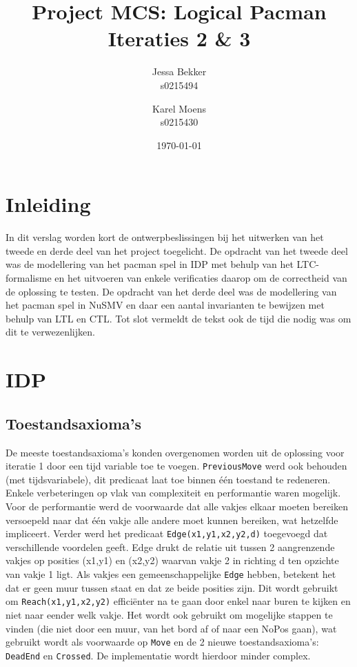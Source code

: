 \documentclass[a4paper,12pt]{article}
\title{Project MCS: Logical Pacman \\ Iteraties 2 \& 3}
\author{Jessa Bekker\\s0215494 \and Karel Moens \\ s0215430 }
\date{\today}
\begin{document}
\maketitle


\section{Inleiding}
In dit verslag worden kort de ontwerpbeslissingen bij het uitwerken van het tweede en derde deel van het project toegelicht.
De opdracht van het tweede deel was de modellering van het pacman spel  in IDP met behulp van het LTC-formalisme en het uitvoeren van enkele verificaties daarop om de correctheid van de oplossing te testen.
De opdracht van het derde deel was de modellering van het pacman spel in NuSMV en daar een aantal invarianten te bewijzen met behulp van LTL en CTL.
Tot slot vermeldt de tekst ook de tijd die nodig was om dit te verwezenlijken.

\section{IDP}
\subsection{Toestandsaxioma's}
De meeste toestandsaxioma's konden overgenomen worden uit de oplossing voor iteratie 1 door een tijd variable toe te voegen. \texttt{PreviousMove} werd ook behouden (met tijdsvariabele), dit predicaat laat toe binnen \'e\'en toestand te redeneren. Enkele verbeteringen op vlak van complexiteit en performantie waren mogelijk. Voor de performantie werd de voorwaarde dat alle vakjes elkaar moeten bereiken versoepeld naar dat \'e\'en vakje alle andere moet kunnen bereiken, wat hetzelfde impliceert. Verder werd het predicaat \texttt{Edge(x1,y1,x2,y2,d)} toegevoegd dat verschillende voordelen geeft. Edge drukt de relatie uit tussen 2 aangrenzende vakjes op posities (x1,y1) en (x2,y2) waarvan vakje 2 in richting d ten opzichte van vakje 1 ligt. Als vakjes een gemeenschappelijke \texttt{Edge} hebben, betekent het dat er geen muur tussen staat en dat ze beide posities zijn. Dit wordt gebruikt om \texttt{Reach(x1,y1,x2,y2)} effici\"enter na te gaan door enkel naar buren te kijken en niet naar eender welk vakje. Het wordt ook gebruikt om mogelijke stappen te vinden (die niet door een muur, van het bord af of naar een NoPos gaan), wat gebruikt wordt als voorwaarde op \texttt{Move} en de 2 nieuwe toestandsaxioma's: \texttt{DeadEnd} en \texttt{Crossed}. De implementatie wordt hierdoor minder complex.
\end{document}
